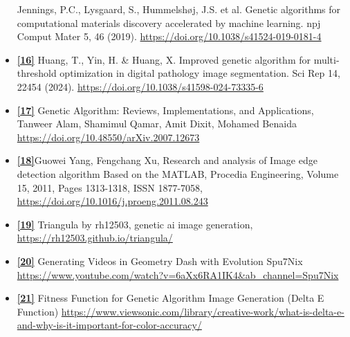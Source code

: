 \documentclass[10pt, conference]{IEEEtran}
\begin{document}
\begin{itemize}
	      Jennings, P.C., Lysgaard, S., Hummelshøj, J.S. et al. Genetic algorithms for computational materials discovery accelerated by machine learning. npj Comput Mater 5, 46 (2019). \url{https://doi.org/10.1038/s41524-019-0181-4}
	\item \textbf{\hyperref[sec:16]{[16]}\label{sec:16r}}
	      Huang, T., Yin, H. \& Huang, X. Improved genetic algorithm for multi-threshold optimization in digital pathology image segmentation. Sci Rep 14, 22454 (2024). \url{https://doi.org/10.1038/s41598-024-73335-6}
	\item \textbf{\hyperref[sec:17]{[17]}\label{sec:17r}}
	      Genetic Algorithm: Reviews, Implementations, and Applications,  Tanweer Alam, Shamimul Qamar, Amit Dixit, Mohamed Benaida
	      \url{https://doi.org/10.48550/arXiv.2007.12673}
	\item \textbf{\hyperref[sec:18]{[18]}\label{sec:18r}}Guowei Yang, Fengchang Xu,
	      Research and analysis of Image edge detection algorithm Based on the MATLAB,
	      Procedia Engineering,
	      Volume 15,
	      2011,
	      Pages 1313-1318,
	      ISSN 1877-7058, \url{https://doi.org/10.1016/j.proeng.2011.08.243}
	\item \textbf{\hyperref[sec:19]{[19]}\label{sec:19r}} Triangula by rh12503, genetic ai image generation, \url{https://rh12503.github.io/triangula/}
	\item \textbf{\hyperref[sec:20]{[20]}\label{sec:20r}} Generating Videos in Geometry Dash with Evolution
	      Spu7Nix	\url{https://www.youtube.com/watch?v=6aXx6RA1IK4&ab_channel=Spu7Nix}
	\item \textbf{\hyperref[sec:21]{[21]}\label{sec:21r}}
	      Fitness Function for Genetic Algorithm Image Generation (Delta E Function)
	      \url{https://www.viewsonic.com/library/creative-work/what-is-delta-e-and-why-is-it-important-for-color-accuracy/}

\end{itemize}
\end{document}
